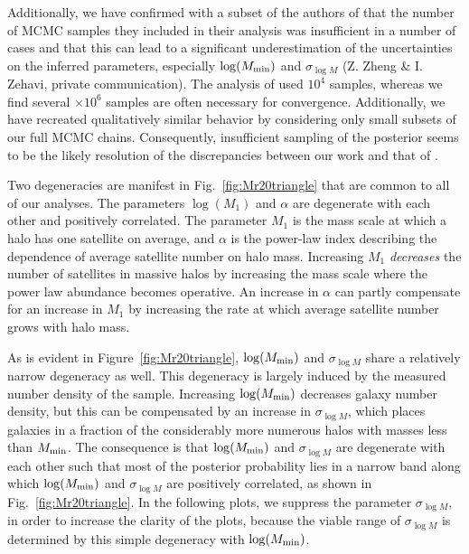 \documentclass[usenatbib,usegraphicx,letterpaper]{mn2e}
\begin{document}
Additionally, we have confirmed with a subset of the authors of \citet{zehavi_etal11} 
that the number of MCMC samples they included in their analysis was 
insufficient in a number of cases and that this can lead to a significant underestimation of the uncertainties 
on the inferred parameters, especially $\log (M_{\rm min})$ and $\sigma_{\log M}$ 
(Z. Zheng \& I. Zehavi, private communication). The analysis of \citet{zehavi_etal11} 
used $10^4$ samples, whereas we find several $\times 10^6$ samples are often necessary for convergence. 
Additionally, we have recreated qualitatively similar behavior by considering only small subsets of our 
full MCMC chains. Consequently, insufficient sampling of the posterior seems to be the likely resolution 
of the discrepancies between our work and that of \citet{zehavi_etal11}.

Two degeneracies are manifest in Fig.~\ref{fig:Mr20triangle} that are common to all of our 
analyses. The parameters $\log (M_1)$ and $\alpha$ are degenerate with each other and positively 
correlated. The parameter $M_1$ is the mass scale at which a halo has one satellite on 
average, and $\alpha$ is the power-law index describing the dependence of average satellite 
number on halo mass. Increasing $M_1$ {\em decreases} the number of satellites in massive halos 
by increasing the mass scale where the power law abundance becomes operative. An increase in $\alpha$ can partly 
compensate for an increase in $M_1$ by increasing the rate at which average satellite number 
grows with halo mass. 

As is evident in Figure~\ref{fig:Mr20triangle}, $\log (M_{\rm min})$ and $\sigma_{\log M}$ 
share a relatively narrow degeneracy as well. This degeneracy is largely induced by the 
measured number density of the sample. Increasing $\log (M_{\rm min})$ decreases galaxy 
number density, but this can be compensated by an increase in $\sigma_{\log M}$, which 
places galaxies in a fraction of the considerably more numerous halos with masses less 
than $M_{\rm min}$. The consequence is that $\log (M_{\rm min})$ and $\sigma_{\log M}$ are 
degenerate with each other such that most of the posterior probability lies in a narrow band 
along which $\log (M_{\rm min})$ and $\sigma_{\log M}$ are positively correlated, as shown in 
Fig.~\ref{fig:Mr20triangle}. In the following plots, we suppress the parameter $\sigma_{\log M}$,  
in order to increase the clarity of the plots, because the viable range of $\sigma_{\log M}$ is 
determined by this simple degeneracy with $\log (M_{\rm min})$. 
\end{document}
